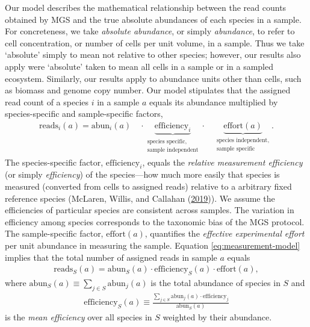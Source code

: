 \documentclass[
]{article}
\begin{document}
Our model describes the mathematical relationship between the read counts obtained by MGS and the true absolute abundances of each species in a sample.
For concreteness, we take \emph{absolute abundance}, or simply \emph{abundance}, to refer to cell concentration, or number of cells per unit volume, in a sample.
Thus we take `absolute' simply to mean not relative to other species; however, our results also apply were `absolute' taken to mean all cells in a sample or in a sampled ecosystem.
Similarly, our results apply to abundance units other than cells, such as biomass and genome copy number.
Our model stipulates that the assigned read count of a species \(i\) in a sample \(a\) equals its abundance multiplied by species-specific and sample-specific factors,
\begin{align}
  \label{eq:measurement-model}
  \text{reads}_{i}(a)
  = \text{abun}_{i}(a) \quad \cdot
    \underbrace{\text{efficiency}_{i}}_{\substack{\text{species specific,} \\  \text{sample independent}}}
    \cdot \quad
    \underbrace{\text{effort}(a)}_{\substack{\text{species independent,} \\  \text{sample specific}}}.
\end{align}
The species-specific factor, \(\text{efficiency}_{i}\), equals the \emph{relative measurement efficiency} (or simply \emph{efficiency}) of the species---how much more easily that species is measured (converted from cells to assigned reads) relative to a arbitrary fixed reference species (McLaren, Willis, and Callahan (\protect\hyperlink{ref-mclaren2019cons}{2019})).
We assume the efficiencies of particular species are consistent across samples.
The variation in efficiency among species corresponds to the taxonomic bias of the MGS protocol.
The sample-specific factor, \(\text{effort}(a)\), quantifies the \emph{effective experimental effort} per unit abundance in measuring the sample.
Equation \eqref{eq:measurement-model} implies that the total number of assigned reads in sample \(a\) equals
\begin{align}
  \label{eq:total-reads}
  \text{reads}_S(a)
    = \text{abun}_S(a) \cdot \text{efficiency}_S(a) \cdot \text{effort}(a),
\end{align}
where \(\text{abun}_{S}(a) \equiv \sum_{j\in S}\text{abun}_j(a)\) is the total abundance of species in \(S\) and
\begin{align}
  \label{eq:mean-efficiency}
  \text{efficiency}_S(a) 
    \equiv \frac{\sum_{j\in S}\text{abun}_j(a) \cdot \text{efficiency}_j}{\text{abun}_S(a)}
\end{align}
is the \emph{mean efficiency} over all species in \(S\) weighted by their abundance.
\end{document}
